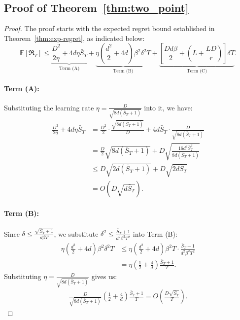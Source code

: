 \documentclass[journal,onecolumn]{IEEEtran}
\theoremstyle{plain}
\theoremstyle{definition}
\theoremstyle{remark}
\newcommand{\regret}{\mathfrak{R}}
\begin{document}
{\subsection{Proof of Theorem~\ref{thm:two_point}}

\begin{proof}
    The proof starts with the expected regret bound established in Theorem~\ref{thm:exp-regret}, as indicated below:
    \begin{equation*}
        \mathbb{E}[\regret_{T}] \le \underbrace{\frac{D^{2}}{2\eta} + 4d\eta \bar{S}_T}
        _{\text{Term (A)}}+ \underbrace{\eta\left(\frac{d^{2}}{2}+4d\right)\beta^2\delta^2T}
        _{\text{Term (B)}}+ \underbrace{\left[ \frac{Dd\beta}{2} + \left(L+\frac{LD}{r}\right)
        \right] \delta T}_{\text{Term (C)}}.
    \end{equation*}

    \paragraph{Term (A):}
    Substituting the learning rate $\eta = \frac{D}{\sqrt{8d(\bar{S}_{T}+1)}}$ into
    it, we have:
    \begin{align*}
        \frac{D^{2}}{2\eta}+ 4d\eta \bar{S}_{T} & = \frac{D^{2}}{2}\cdot \frac{\sqrt{8d (\bar{S}_{T}+1)}}{D}+ 4d \bar{S}_{T}\cdot \frac{D}{\sqrt{8d (\bar{S}_{T}+1)}} \\
        & = \frac{D}{2}\sqrt{8d (\bar{S}_{T}+1)}+ D\sqrt{\frac{16 d^{2}\bar{S}_{T}^{2}}{8d (\bar{S}_{T}+1)}}\\
        & \leq D\sqrt{2d (\bar{S}_{T}+1)}+ D\sqrt{2d \bar{S}_{T}}\\
        &= O\left( D\sqrt{d\bar{S}_{T}}\right).
    \end{align*}

    \paragraph{Term (B):}
    Since $\delta \le \frac{\sqrt{\bar{S}_{T}+1}}{d\beta T}$, we
    substitute $\delta^{2}\le \frac{\bar{S}_{T}+1}{d^{2}\beta^{2}T^{2}}$ into Term
    (B):
    \begin{align*}
        \eta\left(\frac{d^{2}}{2}+4d\right)\beta^{2}\delta^{2}T & \le \eta\left(\frac{d^{2}}{2}+4d\right)\beta^{2}T \cdot \frac{\bar{S}_{T}+1}{d^{2}\beta^{2}T^{2}} \\
        & = \eta \left(\frac{1}{2}+ \frac{4}{d}\right) \frac{\bar{S}_{T}+1}{T}.
    \end{align*}
    Substituting $\eta = \frac{D}{\sqrt{8d (\bar{S}_{T}+1)}}$ gives us:
    \begin{align*}
        \frac{D}{\sqrt{8d (\bar{S}_{T}+1)}}\left(\frac{1}{2}+ \frac{4}{d}\right) \frac{\bar{S}_{T}+1}{T}= O\left( \frac{D \sqrt{\bar{S}_{T}}}{T}\right).
    \end{align*}


\end{proof}}
\end{document}
